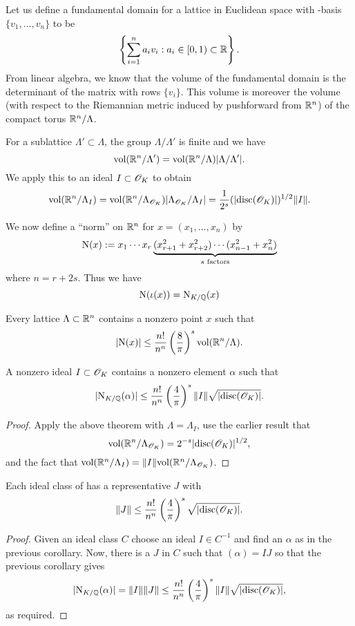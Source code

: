 \documentclass[10pt,a4paper,reqno]{amsart}
\begin{document}
\begin{ap}
Let us define a fundamental domain for a lattice in Euclidean space with
\Z-basis $\{v_1,\dots,v_n\}$ to be \[\left\{ \sum_{i=1}^n a_i v_i : a_i \in
[0,1) \subset \mathbb{R} \right\}.\] From linear algebra, we know that the volume of
the fundamental domain is the determinant of the matrix with rows $\{v_i\}$.
This volume is moreover the volume (with respect to the Riemannian metric
induced by pushforward from $\mathbb{R}^n$) of the compact torus $\mathbb{R}^n/\Lambda$.

For a sublattice $\Lambda' \subset \Lambda$, the group $\Lambda/\Lambda'$ is
finite and we have \[\mathrm{vol}(\mathbb{R}^n/\Lambda') =
\mathrm{vol}(\mathbb{R}^n/\Lambda)|\Lambda/\Lambda'|.\] We apply this to an ideal $I \subset
\mathscr{O}_K$ to obtain \[\mathrm{vol}(\mathbb{R}^n/\Lambda_I) =
\mathrm{vol}(\mathbb{R}^n/\Lambda_{\mathscr{O}_K})|\Lambda_{\mathscr{O}_K}/\Lambda_I| =
\frac{1}{2^s}(|\mathrm{disc}(\mathscr{O}_K)|)^{1/2}\| I\|.\]

We now define a ``norm'' on $\mathbb{R}^n$ for $x = (x_1,\dots,x_n)$ by \[\mathrm{N}(x) := x_1
\cdots x_r \underbrace{(x_{r+1}^2+x_{r+2}^2)\cdots (x_{n-1}^2+x_n^2)}_{s\text{
factors}}\] where $n = r + 2s$. Thus we have \[\mathrm{N}(\iota(x)) = \mathrm{N}_{K/\mathbb{Q}}(x)\]
\end{ap}

\begin{thm}\label{Minkowski}
Every lattice $\Lambda \subset \mathbb{R}^n$ contains a nonzero point $x$ such that
\[|\mathrm{N}(x)| \le \frac{n!}{n^n}\left( \frac{8}{\pi} \right)^s
\mathrm{vol}(\mathbb{R}^n/\Lambda).\]
\end{thm}

\begin{cor}
A nonzero ideal $I\subset \mathscr{O}_K$ contains a nonzero element $\alpha$ such that
\[|\mathrm{N}_{K/\mathbb{Q}}(\alpha)| \le \frac{n!}{n^n} \left( \frac{4}{\pi} \right)^s
\| I\| \sqrt{|\mathrm{disc}(\mathscr{O}_K)|}.\]
\end{cor}
\begin{proof}
Apply the above theorem with $\Lambda = \Lambda_I$, use the earlier result that
\[\mathrm{vol}(\mathbb{R}^n/\Lambda_{\mathscr{O}_K}) = 2^{-s}|\mathrm{disc}(\mathscr{O}_K)|^{1/2},\] and the fact that
$\mathrm{vol}(\mathbb{R}^n/\Lambda_{I}) = \| I\|\mathrm{vol}(\mathbb{R}^n/\Lambda_{\mathscr{O}_K})$.
\end{proof}

\begin{cor}
Each ideal class of \OK{} has a representative $J$ with \[\| J\| \le
\frac{n!}{n^n} \left( \frac{4}{\pi} \right)^s \sqrt{|\mathrm{disc}(\mathscr{O}_K)|}. \]
\end{cor}
\begin{proof}
Given an ideal class $C$ choose an ideal $I\in C^{-1}$ and find an $\alpha$ as
in the previous corollary. Now, there is a $J$ in $C$ such that $(\alpha) = IJ$
so that the previous corollary gives \[|\mathrm{N}_{K/\mathbb{Q}}(\alpha)| = \| I\| \| J\|
\le \frac{n!}{n^n} \left( \frac{4}{\pi} \right)^s \| I\|
\sqrt{|\mathrm{disc}(\mathscr{O}_K)|},\] as required.
\end{proof}
\end{document}
